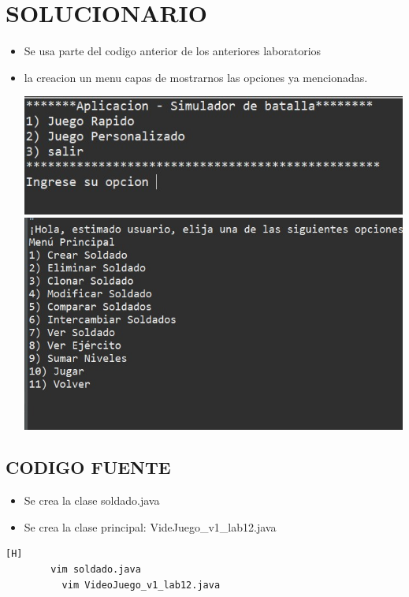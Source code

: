 \documentclass{article}
\begin{document}
	\section{SOLUCIONARIO}
	\begin{itemize}
		\item Se usa parte del codigo anterior de los anteriores laboratorios
		\item  la creacion un menu capas de  mostrarnos las opciones ya mencionadas.
		
		\includegraphics[scale=1]{img/captura 1.jpeg} 
		\includegraphics[scale=1]{img/captura 2.jpeg} 
	\end{itemize}

	\subsection{CODIGO FUENTE}
	\begin{itemize}	
		\item Se crea la clase soldado.java
		\item Se crea la clase principal:   VideJuego_v1_lab12.java

			
	\end{itemize}
	
	\begin{lstlisting}[language=bash,caption={Creando la clase soldado y la clase VideoJuego_v1_lab12}][H]
		vim soldado.java
		  vim VideoJuego_v1_lab12.java
	\end{lstlisting}
	
\end{document}
